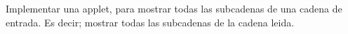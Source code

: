 Implementar una applet, para mostrar todas las subcadenas de una cadena de entrada. Es decir; mostrar todas las subcadenas de la cadena leida.